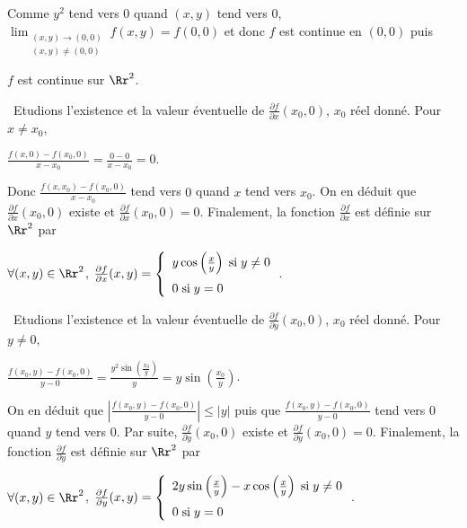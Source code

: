 {{Comme $y^2$ tend vers $0$ quand $(x,y)$ tend vers $0$, $\displaystyle\lim_{\substack{(x,y)\rightarrow(0,0)\\(x,y)\neq(0,0)}}f(x,y)=f(0,0)$ et donc $f$ est continue en $(0,0)$ puis

\begin{center}
$f$ est continue sur $\Rr^2$.
\end{center}

\textbullet~Etudions l'existence et la valeur éventuelle de $ \frac{\partial f}{\partial x}(x_0,0)$, $x_0$ réel donné. Pour $x\neq x_0$,

\begin{center}
$ \frac{f(x,0)-f(x_0,0)}{x-x_0}= \frac{0-0}{x-x_0}=0$.
\end{center}

Donc $ \frac{f(x,x_0)-f(x_0,0)}{x-x_0}$ tend vers $0$ quand $x$ tend vers $x_0$. On en déduit que $ \frac{\partial f}{\partial x}(x_0,0)$ existe et $ \frac{\partial f}{\partial x}(x_0,0)=0$. Finalement, la fonction $ \frac{\partial f}{\partial x}$ est définie sur $\Rr^2$ par

\begin{center}
$\forall (x,y)\in\Rr^2$, $ \frac{\partial f}{\partial x}(x,y)=\left\{
\begin{array}{l}
y\cos\left( \frac{x}{y}\right)\;\text{si}\;y\neq0\\
\rule{0mm}{5mm}0\;\text{si}\;y=0
\end{array}
\right.$.
\end{center}

\textbullet~Etudions l'existence et la valeur éventuelle de $ \frac{\partial f}{\partial y}(x_0,0)$, $x_0$ réel donné. Pour $y\neq 0$,

\begin{center}
$ \frac{f(x_0,y)-f(x_0,0)}{y-0}= \frac{y^2\sin\left( \frac{x_0}{y}\right)}{y}=y\sin\left( \frac{x_0}{y}\right)$.
\end{center}

On en déduit que $\left| \frac{f(x_0,y)-f(x_0,0)}{y-0}\right|\leqslant|y|$ puis que $ \frac{f(x_0,y)-f(x_0,0)}{y-0}$ tend vers $0$ quand $y$ tend vers $0$. Par suite, $ \frac{\partial f}{\partial y}(x_0,0)$ existe et $ \frac{\partial f}{\partial y}(x_0,0)=0$. Finalement, la fonction $ \frac{\partial f}{\partial y}$ est définie sur $\Rr^2$ par

\begin{center}
$\forall (x,y)\in\Rr^2$, $ \frac{\partial f}{\partial y}(x,y)=\left\{
\begin{array}{l}
2y\sin\left( \frac{x}{y}\right)-x\cos\left( \frac{x}{y}\right)\;\text{si}\;y\neq0\\
\rule{0mm}{5mm}0\;\text{si}\;y=0
\end{array}
\right.$.
\end{center}

}}
